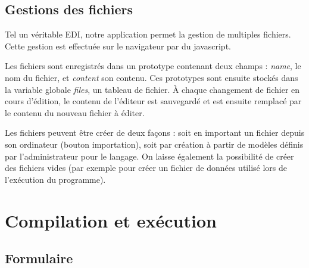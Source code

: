 \subsection{Gestions des fichiers}
Tel un véritable EDI, notre application permet la gestion de multiples fichiers. Cette gestion est effectuée sur le navigateur par du javascript.

Les fichiers sont enregistrés dans un prototype contenant deux champs : \emph{name}, le nom du fichier, et \emph{content} son contenu. Ces prototypes sont ensuite stockés dans la variable globale \emph{files}, un tableau de fichier. À chaque changement de fichier en cours d'édition, le contenu de l'éditeur est sauvegardé et est ensuite remplacé par le contenu du nouveau fichier à éditer.

Les fichiers peuvent être créer de deux façons : soit en important un fichier depuis son ordinateur (bouton importation), soit par création à partir de modèles définis par l'administrateur pour le langage.
On laisse également la possibilité de créer des fichiers vides (par exemple pour créer un fichier de données utilisé lors de l'exécution du programme).


\section{Compilation et exécution}

\subsection{Formulaire}

